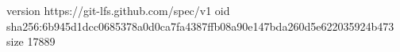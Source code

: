 version https://git-lfs.github.com/spec/v1
oid sha256:6b945d1dcc0685378a0d0ca7fa4387ffb08a90e147bda260d5e622035924b473
size 17889

